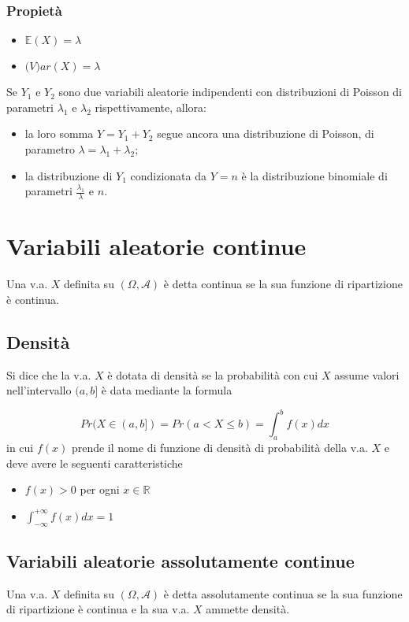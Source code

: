 \documentclass[a4paper]{report}
\begin{document}
  \subsubsection{Propietà}
  \begin{itemize}
    \item $\mathbb{E}(X) = \lambda $
    \item $ \mathbb(V)ar(X) = \lambda $
  \end{itemize}
  Se $Y_1$ e $Y_2$ sono due variabili aleatorie indipendenti con distribuzioni di Poisson di parametri $\lambda_1$ e $\lambda_2$ rispettivamente, allora:
  \begin{itemize}
    \item la loro somma $Y = Y_1 + Y_2$ segue ancora una distribuzione di Poisson, di parametro $\lambda = \lambda_1 + \lambda_2$;
    \item la distribuzione di $Y_1$ condizionata da $Y = n$ è la distribuzione binomiale di parametri $\frac{\lambda_1}{\lambda}$ e $n$.
  \end{itemize}


  \section{Variabili aleatorie continue}
  Una v.a. $X$ definita su $(\Omega, \mathcal{A})$ è detta continua se la sua funzione di ripartizione è continua.

  \subsection{Densità}
  Si dice che la v.a. $X$ è dotata di densità se la probabilità con cui $X$ assume valori nell'intervallo $(a,b]$ è data mediante la formula

  \[ Pr(X \in (a,b]) = Pr(a < X \leqslant b) = \int_{a}^{b} f(x)  dx \]
  in cui $f(x)$ prende il nome di funzione di densità di probabilità della v.a. $X$ e deve avere le seguenti caratteristiche
  \begin{itemize}
    \item $f(x) > 0$ per ogni $x \in \mathbb{R}$
    \item $\int_{-\infty}^{+\infty} f(x) dx = 1$
  \end{itemize}

  \subsection{Variabili aleatorie assolutamente continue}
  Una v.a. $X$ definita su $(\Omega, \mathcal{A})$ è detta assolutamente continua se la sua funzione di ripartizione è continua e la sua v.a. $X$ ammette densità.
\end{document}
